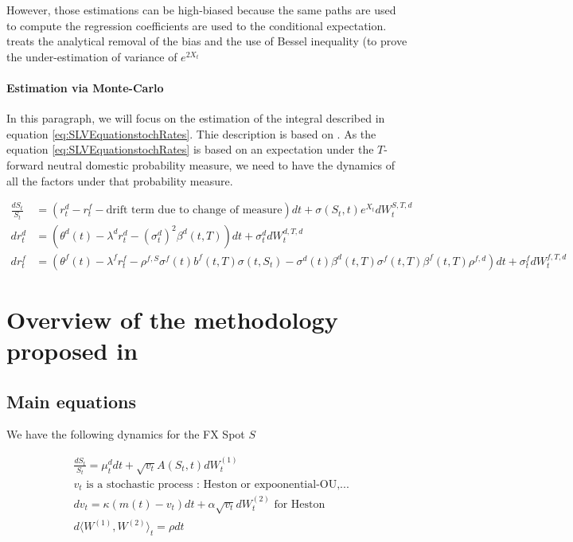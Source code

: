 \documentclass{article}
\begin{document}
\noindent However, those estimations can be high-biased because the same paths are used to compute the regression coefficients are used to the conditional expectation. \cite{Humeau2013} treats the analytical removal of the bias and the use of Bessel inequality (to prove the under-estimation of variance of $e^{2X_t}$

\paragraph{Estimation via Monte-Carlo}

In this paragraph, we will focus on the estimation of the integral described in equation \ref{eq:SLVEquationstochRates}. Thie description is based on \cite{DeelstraRayee2012}. As the equation \ref{eq:SLVEquationstochRates} is based on an expectation under the $T$-forward neutral domestic probability measure, we need to have the dynamics of all the factors under that probability measure.

\begin{equation}
	\begin{aligned}
		\frac{dS_t}{S_t} &= (r_t^d-r_t^f - \text{drift term due to change of measure}) dt + \sigma(S_t, t) e^{X_t} dW^{S,T,d}_t\\
		dr_t^d &= \left(\theta^d(t) - \lambda^d r_t^d - \left(\sigma_t^d\right)^2 \beta^d(t,T) \right) dt + \sigma_t^d dW^{d,T,d}_t\\
		dr_t^f &= \left(\theta^f(t) - \lambda^f r_t^f - \rho^{f,S} \sigma^f(t) b^f(t,T) \sigma(t,S_t)  - \sigma^d(t) \beta^d(t,T) \sigma^f(t,T) \beta^f(t,T) \rho^{f,d}\right) dt + \sigma_t^f dW^{f,T,d}_t
	\end{aligned}
\end{equation}

\section{Overview of the methodology proposed in \cite{Clark2010}}
\subsection{Main equations}

We have the following dynamics for the FX Spot $S$

\begin{equation}
\begin{aligned}
	&\frac{dS_t}{S_t} = \mu^d_t dt + \sqrt{v_t} A(S_t,t) dW_t^{(1)}\\
	&v_t \text{ is a stochastic process : Heston or expoonential-OU,...}\\
	&dv_t = \kappa (m(t) - v_t) dt + \alpha \sqrt{v_t} dW_t^{(2)} \text{ for Heston}\\
	&d\langle W^{(1)}, W^{(2)} \rangle_t = \rho dt
\end{aligned}
\end{equation}
\end{document}
